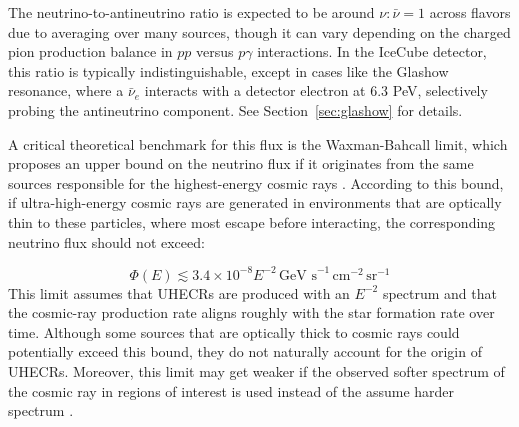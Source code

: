 The neutrino-to-antineutrino ratio is expected to be around \( \nu:\bar{\nu} = 1 \)  across flavors due to averaging over many sources, though it can vary depending on the charged pion production balance in \( pp \) versus \( p\gamma \) interactions. In the IceCube detector, this ratio is typically indistinguishable, except in cases like the Glashow resonance, where a \( \bar{\nu}_e \) interacts with a detector electron at 6.3 PeV, selectively probing the antineutrino component. See Section~\ref{sec:glashow} for details.

A critical theoretical benchmark for this flux is the Waxman-Bahcall limit, which proposes an upper bound on the neutrino flux if it originates from the same sources responsible for the highest-energy cosmic rays . According to this bound, if ultra-high-energy cosmic rays are generated in environments that are optically thin to these particles, where most escape before interacting, the corresponding neutrino flux should not exceed:

\begin{equation}\label{waxman_bahcall}
    \Phi(E) \lesssim 3.4\times10^{-8} E^{-2} \, \text{GeV s}^{-1} \, \text{cm}^{-2} \, \text{sr}^{-1} 
\end{equation}
This limit assumes that UHECRs are produced with an \( E^{-2} \) spectrum and that the cosmic-ray production rate aligns roughly with the star formation rate over time. Although some sources that are optically thick to cosmic rays could potentially exceed this bound, they do not naturally account for the origin of UHECRs. Moreover, this limit may get weaker if the observed softer spectrum of the cosmic ray in regions of interest is used instead of the assume harder spectrum .

